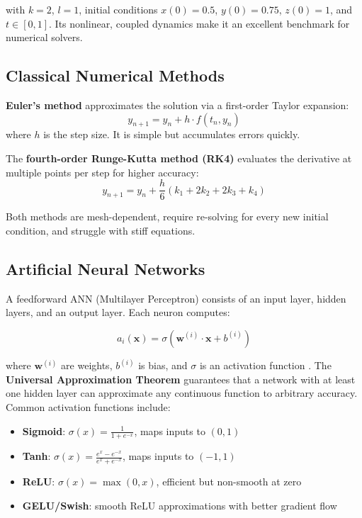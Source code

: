 with $k = 2$, $l = 1$, initial conditions $x(0) = 0.5$, $y(0) = 0.75$, $z(0) = 1$, and $t \in [0, 1]$. Its nonlinear, coupled dynamics make it an excellent benchmark for numerical solvers.

\subsection{Classical Numerical Methods}

\textbf{Euler's method} approximates the solution via a first-order Taylor expansion:
\begin{equation}
y_{n+1} = y_n + h \cdot f(t_n, y_n)
\end{equation}
where $h$ is the step size. It is simple but accumulates errors quickly.

The \textbf{fourth-order Runge-Kutta method (RK4)} evaluates the derivative at multiple points per step for higher accuracy:
\begin{equation}
y_{n+1} = y_n + \frac{h}{6}(k_1 + 2k_2 + 2k_3 + k_4)
\end{equation}

Both methods are mesh-dependent, require re-solving for every new initial condition, and struggle with stiff equations.

\subsection{Artificial Neural Networks}

A feedforward ANN (Multilayer Perceptron) consists of an input layer, hidden layers, and an output layer. Each neuron computes:

\begin{equation}
a_i(\mathbf{x}) = \sigma\left(\mathbf{w}^{(i)} \cdot \mathbf{x} + b^{(i)}\right)
\label{eq:neuron}
\end{equation}

where $\mathbf{w}^{(i)}$ are weights, $b^{(i)}$ is bias, and $\sigma$ is an activation function \cite{lau2020oden}. The \textbf{Universal Approximation Theorem} \cite{lau2020oden, babni2025error} guarantees that a network with at least one hidden layer can approximate any continuous function to arbitrary accuracy. Common activation functions include:
\begin{itemize}
    \item \textbf{Sigmoid}: $\sigma(x) = \frac{1}{1 + e^{-x}}$, maps inputs to $(0, 1)$
    \item \textbf{Tanh}: $\sigma(x) = \frac{e^x - e^{-x}}{e^x + e^{-x}}$, maps inputs to $(-1, 1)$
    \item \textbf{ReLU}: $\sigma(x) = \max(0, x)$, efficient but non-smooth at zero
    \item \textbf{GELU/Swish}: smooth ReLU approximations with better gradient flow
\end{itemize}

